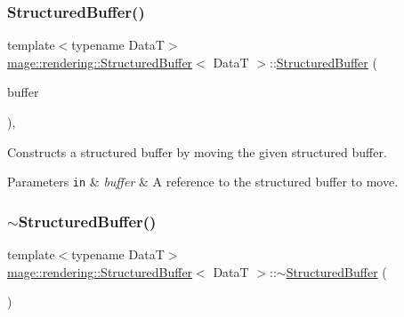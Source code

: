 \subsubsection{\texorpdfstring{Structured\+Buffer()}{StructuredBuffer()}\hspace{0.1cm}{\footnotesize\ttfamily [3/3]}}
{\footnotesize\ttfamily template$<$typename DataT$>$ \\
\mbox{\hyperlink{classmage_1_1rendering_1_1_structured_buffer}{mage\+::rendering\+::\+Structured\+Buffer}}$<$ DataT $>$\+::\mbox{\hyperlink{classmage_1_1rendering_1_1_structured_buffer}{Structured\+Buffer}} (\begin{DoxyParamCaption}\item[{\mbox{\hyperlink{classmage_1_1rendering_1_1_structured_buffer}{Structured\+Buffer}}$<$ DataT $>$ \&\&}]{buffer }\end{DoxyParamCaption})\hspace{0.3cm}{\ttfamily [default]}, {\ttfamily [noexcept]}}

Constructs a structured buffer by moving the given structured buffer.


\begin{DoxyParams}[1]{Parameters}
\mbox{\tt in}  & {\em buffer} & A reference to the structured buffer to move. \\
\hline
\end{DoxyParams}
\mbox{\label{classmage_1_1rendering_1_1_structured_buffer_a6c2ccb0efe7157e94f841981be71b6c7}} 
\subsubsection{\texorpdfstring{$\sim$\+Structured\+Buffer()}{~StructuredBuffer()}}
{\footnotesize\ttfamily template$<$typename DataT$>$ \\
\mbox{\hyperlink{classmage_1_1rendering_1_1_structured_buffer}{mage\+::rendering\+::\+Structured\+Buffer}}$<$ DataT $>$\+::$\sim$\mbox{\hyperlink{classmage_1_1rendering_1_1_structured_buffer}{Structured\+Buffer}} (\begin{DoxyParamCaption}{ }\end{DoxyParamCaption})\hspace{0.3cm}{\ttfamily [default]}}

